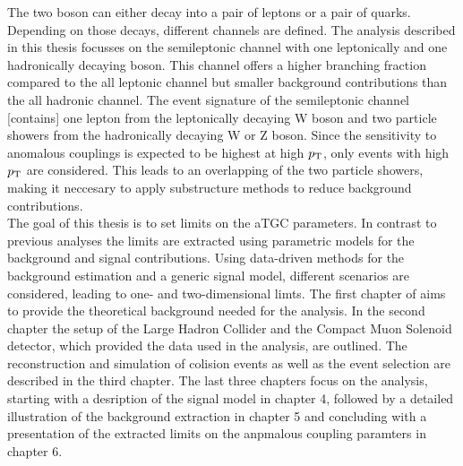 The two boson can either decay into a pair of leptons or a pair of quarks. Depending on those decays, different channels are defined. The analysis described in this thesis focusses on the semileptonic channel with one leptonically and one hadronically decaying boson. This channel offers a higher branching fraction compared to the all leptonic channel but smaller background contributions than the all hadronic channel. The event signature of the semileptonic channel [contains] one lepton from the leptonically decaying W boson and two particle showers from the hadronically decaying W or Z boson. Since the sensitivity to anomalous couplings is expected to be highest at high $p_{\rm T}$, only events with high $p_{\rm T}$ are considered. This leads to an overlapping of the two particle showers, making it neccesary to apply substructure methods to reduce background contributions. \\

The goal of this thesis is to set limits on the aTGC parameters. In contrast to previous analyses the limits are extracted using parametric models for the background and signal contributions. Using data-driven methods for the background estimation and a generic signal model, different scenarios are considered, leading to one- and two-dimensional limts. The first chapter of aims to provide the theoretical background needed for the analysis. In the second chapter the setup of the Large Hadron Collider and the Compact Muon Solenoid detector, which provided the data used in the analysis, are outlined. The reconstruction and simulation of colision events as well as the event selection are described in the third chapter. The last three chapters focus on the analysis, starting with a desription of the signal model in chapter 4, followed by a detailed illustration of the background extraction in chapter 5 and concluding with a presentation of the extracted limits on the anpmalous coupling paramters in chapter 6.





